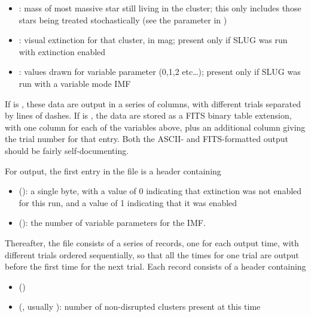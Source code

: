 \documentclass[letterpaper,10pt,english]{sphinxmanual}
\begin{document}
\begin{itemize}
\item {} 
: mass of most massive star still living in the cluster; this only includes those stars being treated stochastically (see the parameter  in {\hyperref[\detokenize{parameters:ssec-stellar-keywords}]{}})

\item {} 
: visual extinction for that cluster, in mag; present only if SLUG was run with extinction enabled

\item {} 
: values drawn for variable parameter  (0,1,2 etc…); present only if SLUG was run with a variable mode IMF

\end{itemize}

If  is , these data are output in a series of columns, with different trials separated by lines of dashes. If  is , the data are stored as a FITS binary table extension, with one column for each of the variables above, plus an additional column giving the trial number for that entry. Both the ASCII- and FITS-formatted output should be fairly self-documenting.

For  output, the first entry in the file is a header containing
\begin{itemize}
\item {} 
 (): a single byte, with a value of 0 indicating that extinction was not enabled for this run, and a value of 1 indicating that it was enabled

\item {} 
 (): the number of variable parameters for the IMF.

\end{itemize}

Thereafter, the file consists of a series of records, one for each output time, with different trials ordered sequentially, so that all the times for one trial are output before the first time for the next trial. Each record consists of a header containing
\begin{itemize}
\item {} 
 ()

\item {} 
 (, usually ): number of non-disrupted clusters present at this time

\end{itemize}
\end{document}
